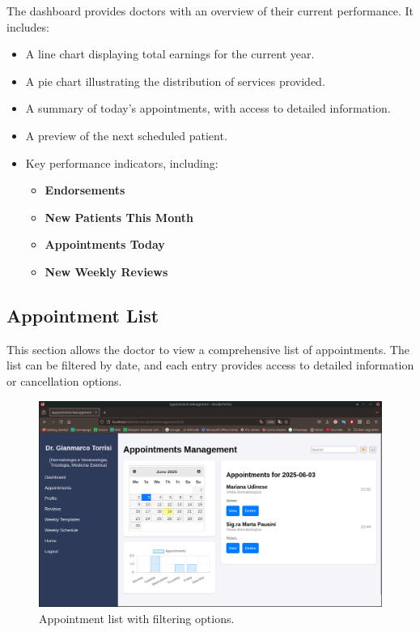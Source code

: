 The dashboard provides doctors with an overview of their current performance. It includes:
\begin{itemize}
	\item A line chart displaying total earnings for the current year.
	\item A pie chart illustrating the distribution of services provided.
	\item A summary of today's appointments, with access to detailed information.
	\item A preview of the next scheduled patient.
	\item Key performance indicators, including:
	\begin{itemize}
		\item \textbf{Endorsements}
		\item \textbf{New Patients This Month}
		\item \textbf{Appointments Today}
		\item \textbf{New Weekly Reviews}
	\end{itemize}
\end{itemize}

\subsection{Appointment List}
This section allows the doctor to view a comprehensive list of appointments. The list can be filtered by date, and each entry provides access to detailed information or cancellation options.

\begin{figure}[!h]
	\centering
	\includegraphics[scale=0.30]{resources/screenshots/doctor_ui/appointments.png}
	\caption{Appointment list with filtering options.}
	\label{fig:appointment_list}
\end{figure}

